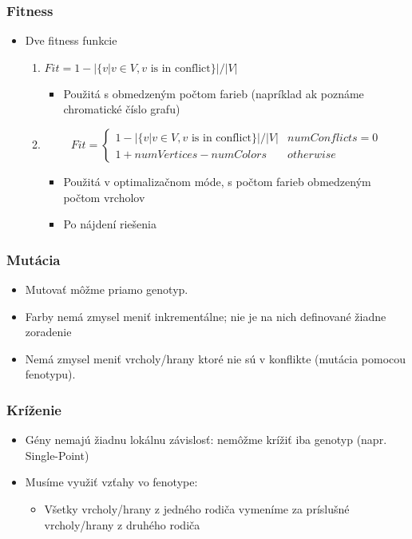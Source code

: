 \begin{frame}
	\frametitle{Fitness}
	\begin{itemize}
		\item Dve fitness funkcie
		\begin{enumerate}
			\item $Fit = 1 - |\{v | v \in V, v \text{ is in conflict}\}| / |V|$
			\begin{itemize}
				\item Použitá s obmedzeným počtom farieb (napríklad ak poznáme chromatické číslo grafu)
			\end{itemize}
		
			\item \begin{equation*}
				Fit = 
				\begin{cases}
					1 - |\{v | v \in V, v \text{ is in conflict}\}| / |V| & numConflicts = 0	\\
					1 + numVertices - numColors  & otherwise	
				\end{cases}
			\end{equation*}
			\begin{itemize}
				\item Použitá v optimalizačnom móde, s počtom farieb obmedzeným počtom vrcholov
				\item Po nájdení riešenia 
			\end{itemize}
		\end{enumerate}
	\end{itemize}
\end{frame}

\begin{frame}
	\frametitle{Mutácia}
	\begin{itemize}
		\item Mutovať môžme priamo genotyp.
		\item Farby nemá zmysel meniť inkrementálne; nie je na nich definované žiadne zoradenie
		\item Nemá zmysel meniť vrcholy/hrany ktoré nie sú v konflikte (mutácia pomocou fenotypu).
	\end{itemize}
	
\end{frame}

\begin{frame}
	\frametitle{Kríženie}
	\begin{itemize}
		\item Gény nemajú žiadnu lokálnu závislosť: nemôžme krížiť iba genotyp (napr. Single-Point)
		\item Musíme využiť vzťahy vo fenotype:
		\begin{itemize}
			\item Všetky vrcholy/hrany z jedného rodiča vymeníme za príslušné vrcholy/hrany z druhého rodiča
		\end{itemize}
	\end{itemize}
\end{frame}

